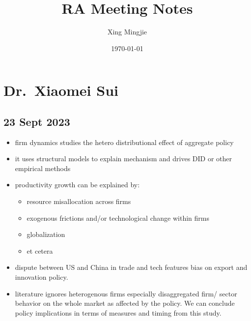 \usepackage{sectsty}
\allsectionsfont{\rmfamily\bfseries\upshape} %

\usepackage[nottoc,notlof,notlot]{tocbibind} %
\usepackage[titles,subfigure]{tocloft} %
\renewcommand{\cftsecfont}{\rmfamily\mdseries\upshape}
\renewcommand{\cftsecpagefont}{\rmfamily\mdseries\upshape} %

\usepackage[colorlinks,citecolor=black,urlcolor=black,bookmarks=false,hypertexnames=true]{hyperref} 




\title{RA Meeting Notes}
\author{Xing Mingjie}
\date{\today} %


\maketitle

\tableofcontents

\newpage

\section{Dr.\ Xiaomei Sui}
	\subsection{23 Sept 2023}
		\begin{itemize}
		\item firm dynamics studies the hetero distributional effect of aggregate policy
		\item it uses structural models to explain mechanism and drives DID or other empirical methods
		\item productivity growth can be explained by:
			\begin{itemize}
			\item resource misallocation across firms
			\item exogenous frictions and/or technological change within firms
			\item globalization
			\item et cetera
			\end{itemize}
		\item dispute between US and China in trade and tech features bias on export and innovation policy.
		\item literature ignores heterogenous firms especially disaggregated firm/ sector behavior on the whole market as affected by the policy. We can conclude policy implications in terms of measures and timing from this study.
		\end{itemize}
